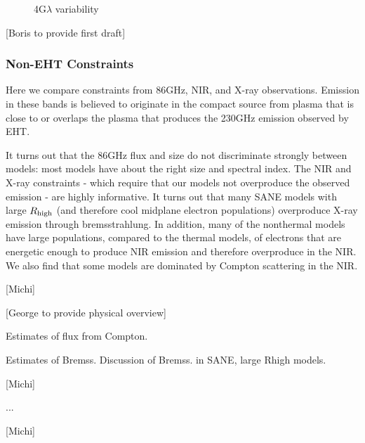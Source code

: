 \begin{figure}
  \caption{4G$\lambda$ variability}
  \label{fig:cmp_VLBI_var}
\end{figure}

[Boris to provide first draft]

\subsubsection{Non-EHT Constraints}

Here we compare constraints from 86GHz, NIR, and X-ray observations.  Emission in these bands is believed to originate in the compact source from plasma that is close to or overlaps the plasma that produces the 230GHz emission observed by EHT.

It turns out that the 86GHz flux and size do not discriminate strongly between models: most models have about the right size and spectral index.  The NIR and X-ray constraints - which require that our models not overproduce the observed emission - are highly informative.  It turns out that many SANE models with large $R_\mathrm{high}$ (and therefore cool midplane electron populations) overproduce X-ray emission through bremsstrahlung.  In addition, many of the nonthermal models have large populations, compared to the thermal models, of electrons that are energetic enough to produce NIR emission and therefore overproduce in the NIR.   We also find that some models are dominated by Compton scattering in the NIR.



[Michi]


[George to provide physical overview]

Estimates of flux from Compton.

Estimates of Bremss.  Discussion of Bremss. in SANE, large Rhigh models.

[Michi]


...

[Michi]

